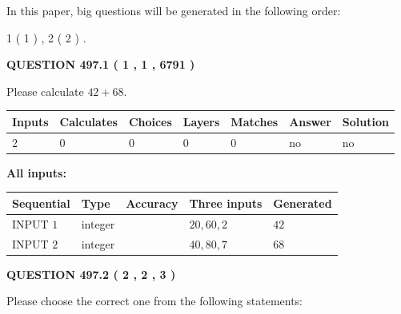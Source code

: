 \documentclass[12pt]{article}
\begin{document}
\vspace{0.2in}
   
In this paper, big questions will be generated in the following order: 
   
   
   1 ( 1 )
 ,
   2 ( 2 )
 .
  
\vspace{0.2in}
  
{\textbf{\Large{QUESTION
497.1 
 ( 1 , 1 , 6791 )
}}}
  
  
 
Please calculate $ %
42 +  %
68 $.
 
 
   
   
   
   
\noindent\begin{tabular}{|l|l|l|l|l|l|l|}
 \hline
Inputs & Calculates & Choices & Layers & Matches & Answer & Solution \\ \hline
 2  & 
 0  & 
 0
  & 
 0  & 
 0  & 
  no & 
  no 
  \\ \hline
 \end{tabular}
   
   
   
   
\noindent{}
   
   
   
   
\noindent\vspace{0.1in}\hspace{-0.08in} {\textbf{\Large{All inputs: }}}
   
   
  
  
\noindent\begin{tabular}{|l|l|l|l|l|}
\hline
 Sequential & Type & Accuracy & Three inputs & Generated \\ 
\hline
 
 
  INPUT $  1 $ & integer &  & $
 20
 , 
 60
 , 
 2
 $ & $ 42 $ 
 \\  \hline  
 
 
  INPUT $  2 $ & integer &  & $
 40
 , 
 80
 , 
 7
 $ & $ 68 $ 
 \\  \hline  
 \end{tabular}
   
   
  
\vspace{0.2in}
  
{\textbf{\Large{QUESTION
497.2 
 ( 2 , 2 , 3 )
}}}
  
  
Please choose the correct one from the following statements:
 
\end{document}
